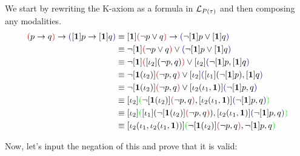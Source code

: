 \begin{example}
    We start by rewriting the K-axiom as a formula in $\mathcal{L}_{P(\tau)}$ and then composing any modalities.
\begin{align*}
    [\textbf{1}]\tcr{(} p \to q\tcr{)} \to \tcb{(}[\textbf{1}]p \to [\textbf{1}]q\tcb{)}
    &\equiv [\textbf{1}]\tcr{(}\neg p \vee q\tcr{)} \to \tcb{(}\neg[\textbf{1}]p \vee [\textbf{1}]q\tcb{)}\\
    &\equiv \neg[\textbf{1}]\tcr{(}\neg p \vee q\tcr{)} \vee \tcb{(}\neg[\textbf{1}]p \vee [\textbf{1}]q\tcb{)}\\
    &\equiv \neg[\textbf{1}]\tcr{(}[\iota_2](\neg p, q)\tcr{)} \vee [\iota_2]\tcb{(}\neg[\textbf{1}]p, [\textbf{1}]q\tcb{)}\\
    &\equiv \neg[\textbf{1}(\iota_2)]\tcr{(}\neg p, q\tcr{)} \vee [\iota_2]\tcb{(}[\iota_1](\neg[\textbf{1}]p), [\textbf{1}]q\tcb{)}\\
    &\equiv \neg[\textbf{1}(\iota_2)]\tcr{(}\neg p, q\tcr{)} \vee [\iota_2(\iota_1,\tb{1})]\tcb{(}\neg[\textbf{1}]p, q\tcb{)}\\
    &\equiv [\iota_2]\tcg{(}\neg[\textbf{1}(\iota_2)]\tcr{(}\neg p, q\tcr{)} , [\iota_2(\iota_1,\tb{1})]\tcb{(}\neg[\textbf{1}]p, q\tcb{)}\tcg{)}\\
    &\equiv [\iota_2]\tcg{(}[\iota_1](\neg[\textbf{1}(\iota_2)]\tcr{(}\neg p, q\tcr{)}), [\iota_2(\iota_1,\tb{1})]\tcb{(}\neg[\textbf{1}]p, q\tcb{)}\tcg{)}\\
    &\equiv [\iota_2(\iota_1,\iota_2(\iota_1,\tb{1}))]\tcg{(}\neg[\textbf{1}(\iota_2)]\tcr{(}\neg p, q\tcr{)} , \neg[\textbf{1}]p, q\tcg{)}\\
\end{align*}

Now, let's input the negation of this and prove that it is valid:




\end{example}
